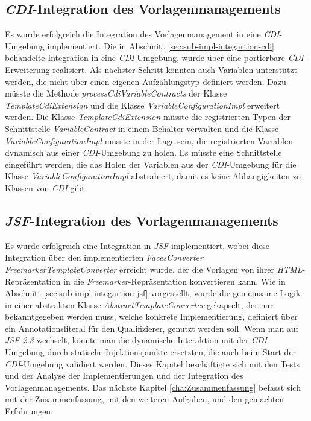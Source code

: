 \subsection{\emph{CDI}-Integration des Vorlagenmanagements}
Es wurde erfolgreich die Integration des Vorlagenmanagement in eine \emph{CDI}-Umgebung implementiert. Die in Abschnitt \ref{sec:sub-impl-integartion-cdi} behandelte Integration in eine \emph{CDI}-Umgebung, wurde über eine portierbare \emph{CDI}-Erweiterung realisiert. Als nächster Schritt könnten auch Variablen unterstützt werden, die nicht über einen eigenen Aufzählungstyp definiert werden. Dazu müsste die Methode \emph{processCdiVariableContracts} der Klasse \emph{TemplateCdiExtension} und die Klasse \emph{VariableConfigurationImpl} erweitert werden. Die Klasse \emph{TemplateCdiExtension} müsste die registrierten Typen der Schnittstelle \emph{VariableContract} in einem Behälter verwalten und die Klasse \emph{VariableConfigurationImpl} müsste in der Lage sein, die registrierten Variablen dynamisch aus einer \emph{CDI}-Umgebung zu holen. Es müsste eine Schnittstelle eingeführt werden, die das Holen der Variablen aus der \emph{CDI}-Umgebung für die Klasse \emph{VariableConfigurationImpl} abstrahiert, damit es keine Abhängigkeiten zu Klassen von \emph{CDI} gibt.

\subsection{\emph{JSF}-Integration des Vorlagenmanagements}
Es wurde erfolgreich eine Integration in \emph{JSF} implementiert, wobei diese Integration über den implementierten \emph{FacesConverter} \emph{FreemarkerTemplateConverter} erreicht wurde, der die Vorlagen von ihrer \emph{HTML}-Repräsentation in die \emph{Freemarker}-Repräsentation konvertieren kann. Wie in Abschnitt \ref{sec:sub-impl-integartion-jsf} vorgestellt, wurde die gemeinsame Logik in einer abstrakten Klasse \emph{AbstractTemplateConverter} gekapselt, der nur bekanntgegeben werden muss, welche konkrete Implementierung, definiert über ein Annotationsliteral für den Qualifizierer, genutzt werden soll. Wenn man auf \emph{JSF 2.3} wechselt, könnte man die dynamische Interaktion mit der \emph{CDI}-Umgebung durch statische Injektionspunkte ersetzten, die auch beim Start der \emph{CDI}-Umgebung validiert werden. 
\newline
\newline
Dieses Kapitel beschäftigte sich mit den Tests und der Analyse der Implementierungen und der Integration des Vorlagenmanagements. Das nächste Kapitel \ref{cha:Zusammenfassung} befasst sich mit der Zusammenfassung, mit den weiteren Aufgaben, und den gemachten Erfahrungen.